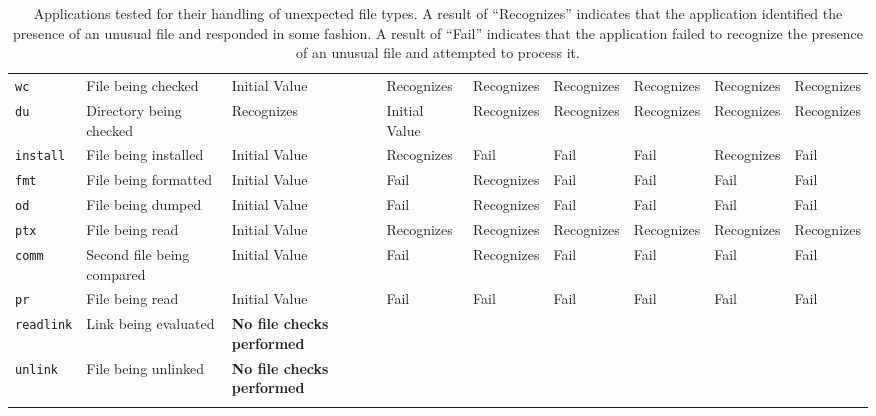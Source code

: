 \begin{table}[t]
\begin{tabular}{l  l  |  l  l  l  l  l  l  l}
        {\tt wc}          & File being checked         & Initial Value  & Recognizes     & Recognizes  & Recognizes & Recognizes  & Recognizes & Recognizes\\
        {\tt du}          & Directory being checked    & Recognizes     & Initial Value  & Recognizes  & Recognizes & Recognizes  & Recognizes & Recognizes\\
        {\tt install}     & File being installed       & Initial Value  & Recognizes     & Fail       & Fail      & Fail       & Recognizes & Fail\\
        {\tt fmt}         & File being formatted       & Initial Value  & Fail           & Recognizes  & Fail      & Fail       & Fail      & Fail\\
        {\tt od}          & File being dumped          & Initial Value  & Fail           & Recognizes  & Fail      & Fail       & Fail      & Fail\\
        {\tt ptx}         & File being read            & Initial Value  & Recognizes     & Recognizes  & Recognizes & Recognizes  & Recognizes & Recognizes\\
        {\tt comm}        & Second file being compared & Initial Value  & Fail           & Recognizes  & Fail       & Fail        & Fail       & Fail\\
        {\tt pr}          & File being read            & Initial Value  & Fail           & Fail        & Fail       & Fail        & Fail       & Fail\\
\hline
        {\tt readlink}    & Link being evaluated       & \textbf{No file checks performed} & & & & & & \\
        {\tt unlink}      & File being unlinked        & \textbf{No file checks performed} & & & & & & \\
    \bottomrule{}
    \end{tabular}
    \caption{Applications tested for their handling of unexpected file types.  A
    result of ``Recognizes'' indicates that the application identified the
    presence of an unusual file and responded in some fashion.  A result of
    ``Fail'' indicates that the application failed to recognize the presence of
    an unusual file and attempted to process it.}
    \label{table:unexpectedtypes}
\end{table}


